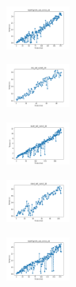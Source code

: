 \begin{figure}[H]
\begin{subfigure}
    \end{subfigure}
    \hfill
    \begin{subfigure}
        \centering
        \includegraphics[width=0.234\textwidth]{img/bl/newthyroid_set_const_20_277451237_time.png}
    \end{subfigure}
    \hfill
    \begin{subfigure}
        \centering
        \includegraphics[width=0.234\textwidth]{img/bl/iris_set_const_20_49258669_time.png}
    \end{subfigure}
    \hfill
    \begin{subfigure}
        \centering
        \includegraphics[width=0.234\textwidth]{img/bl/ecoli_set_const_20_49258669_time.png}
    \end{subfigure}
    \hfill
    \begin{subfigure}
        \centering
        \includegraphics[width=0.234\textwidth]{img/bl/rand_set_const_20_49258669_time.png}
    \end{subfigure}
    \hfill
    \begin{subfigure}
        \centering
        \includegraphics[width=0.234\textwidth]{img/bl/newthyroid_set_const_20_49258669_time.png}
    \end{subfigure}
    \hfill
    \begin{subfigure}

\end{subfigure}
\end{figure}
